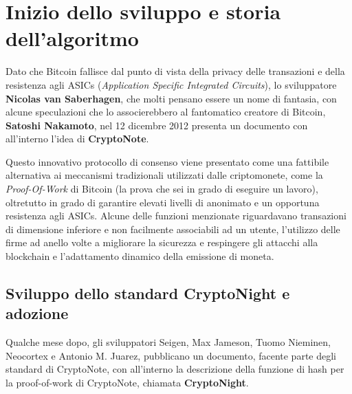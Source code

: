 \section{Inizio dello sviluppo e storia
dell'algoritmo}\label{inizio-dello-sviluppo-e-storia-dellalgoritmo}

Dato che Bitcoin fallisce dal punto di vista della privacy delle
transazioni e della resistenza agli ASICs (\emph{Application Specific
Integrated Circuits}), lo sviluppatore \textbf{Nicolas van Saberhagen},
che molti pensano essere un nome di fantasia, con alcune speculazioni
che lo associerebbero al fantomatico creatore di Bitcoin,
\textbf{Satoshi Nakamoto}, nel 12 dicembre 2012 presenta un documento
con all'interno l'idea di \textbf{CryptoNote}.

Questo innovativo protocollo di consenso viene presentato come una
fattibile alternativa ai meccanismi tradizionali utilizzati dalle
criptomonete, come la \emph{Proof-Of-Work} di Bitcoin (la prova che sei
in grado di eseguire un lavoro), oltretutto in grado di garantire
elevati livelli di anonimato e un opportuna resistenza agli ASICs.
Alcune delle funzioni menzionate riguardavano transazioni di dimensione
inferiore e non facilmente associabili ad un utente, l'utilizzo delle
firme ad anello volte a migliorare la sicurezza e respingere gli
attacchi alla blockchain e l'adattamento dinamico della emissione di
moneta.

\subsection{Sviluppo dello standard CryptoNight e
adozione}\label{sviluppo-dello-standard-cryptonight-e-adozione}

Qualche mese dopo, gli sviluppatori Seigen, Max Jameson, Tuomo Nieminen,
Neocortex e Antonio M. Juarez, pubblicano un documento, facente parte
degli standard di CryptoNote, con all'interno la descrizione della
funzione di hash per la proof-of-work di CryptoNote, chiamata
\textbf{CryptoNight}.

